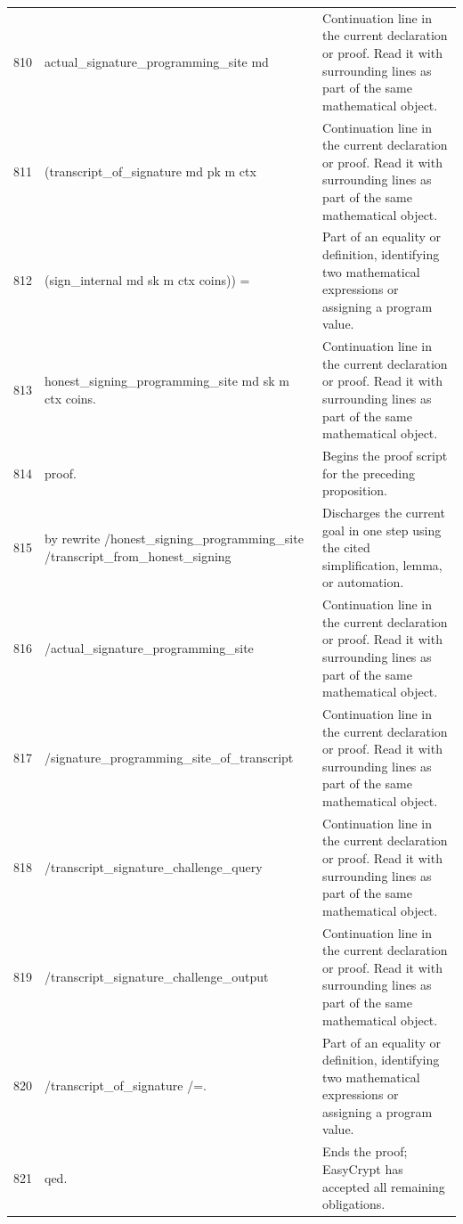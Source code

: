 \documentclass[10pt]{article}
\begin{document}
\begin{longtable}{r L{0.53\textwidth} L{0.37\textwidth}}
810 & {\ttfamily\scriptsize   actual\_signature\_programming\_site md} & Continuation line in the current declaration or proof.  Read it with surrounding lines as part of the same mathematical object. \\
811 & {\ttfamily\scriptsize     (transcript\_of\_signature md pk m ctx} & Continuation line in the current declaration or proof.  Read it with surrounding lines as part of the same mathematical object. \\
812 & {\ttfamily\scriptsize       (sign\_internal md sk m ctx coins)) =} & Part of an equality or definition, identifying two mathematical expressions or assigning a program value. \\
813 & {\ttfamily\scriptsize   honest\_signing\_programming\_site md sk m ctx coins.} & Continuation line in the current declaration or proof.  Read it with surrounding lines as part of the same mathematical object. \\
814 & {\ttfamily\scriptsize proof.} & Begins the proof script for the preceding proposition. \\
815 & {\ttfamily\scriptsize by rewrite /honest\_signing\_programming\_site /transcript\_from\_honest\_signing} & Discharges the current goal in one step using the cited simplification, lemma, or automation. \\
816 & {\ttfamily\scriptsize            /actual\_signature\_programming\_site} & Continuation line in the current declaration or proof.  Read it with surrounding lines as part of the same mathematical object. \\
817 & {\ttfamily\scriptsize            /signature\_programming\_site\_of\_transcript} & Continuation line in the current declaration or proof.  Read it with surrounding lines as part of the same mathematical object. \\
818 & {\ttfamily\scriptsize            /transcript\_signature\_challenge\_query} & Continuation line in the current declaration or proof.  Read it with surrounding lines as part of the same mathematical object. \\
819 & {\ttfamily\scriptsize            /transcript\_signature\_challenge\_output} & Continuation line in the current declaration or proof.  Read it with surrounding lines as part of the same mathematical object. \\
820 & {\ttfamily\scriptsize            /transcript\_of\_signature /=.} & Part of an equality or definition, identifying two mathematical expressions or assigning a program value. \\
821 & {\ttfamily\scriptsize qed.} & Ends the proof; EasyCrypt has accepted all remaining obligations. \\

\end{longtable}
\end{document}
